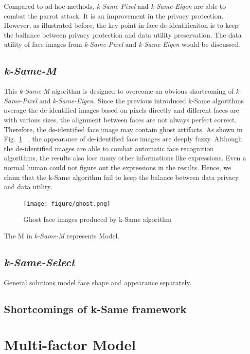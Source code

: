 	Compared to ad-hoc methods, \emph{k-Same-Pixel} and \emph{k-Same-Eigen} are able to combat the parrot attack. It is an improvement in the privacy protection. However, as illustrated before, the key point in face de-identificaiton is to keep the ballance between privacy protection and data utility preservation. The data utility of face images from \emph{k-Same-Pixel} and \emph{k-Same-Eigen} would be discussed. 
 	
 	\subsection{\emph{k-Same-M}}
 	This \emph{k-Same-M} algorithm is designed to overcome an obvious shortcoming of \emph{k-Same-Pixel} and \emph{k-Same-Eigen}. Since the previous introduced k-Same algorithms average the de-identified images based on pixels directly and different faces are with various sizes, the alignment between faces are not always perfect correct. Therefore, the de-identified face image may contain ghost artifacts. As shown in Fig.~\ref{ghostFace} ~\cite{Gross08}, the appearance of de-identified face images are deeply fuzzy. Although the de-identified images are able to combat automatic face recognition algorithms, the results also lose many other informations like expressions. Even a normal human could not figure out the expressions in the results. Hence, we claim that the k-Same algorithm fail to keep the balance between data privacy and data utility. 
	 	\begin{figure}[!htb]
			  \centering
			  \texttt{[image: figure/ghost.png]} 
			  \caption{Ghost face images produced by k-Same algorithm}
			  \label{ghostFace}
		\end{figure}
 	The M in \emph{k-Same-M} represents Model. 

	\subsection{\emph{k-Same-Select}}
	
	General solutions model face shape and appearance separately. 

	\subsection{Shortcomings of k-Same framework}

	\section{Multi-factor Model}